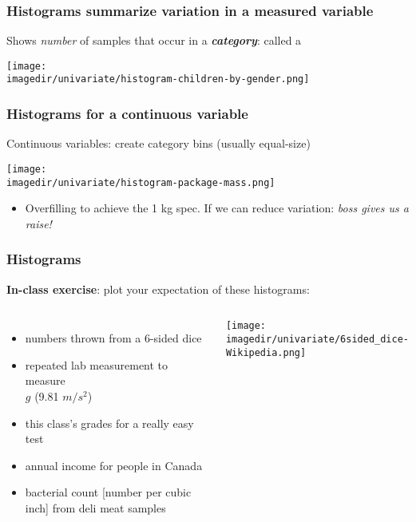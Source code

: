 \begin{frame}\frametitle{Histograms summarize variation in a measured variable}

	Shows \emph{number} of samples that occur in a \emph{\textbf{category}}: called a {}
	\begin{center}
		\texttt{[image: \\imagedir/univariate/histogram-children-by-gender.png]}
	\end{center}
\end{frame}

\begin{frame}\frametitle{Histograms for a \textbf{continuous} variable}
	Continuous variables: create category bins (usually equal-size)
	\begin{center}
		\texttt{[image: \\imagedir/univariate/histogram-package-mass.png]}
	\end{center}
	\begin{itemize}
		\item	Overfilling to achieve the 1 kg spec. If we can reduce variation: \emph{boss gives us a raise!}
	\end{itemize}
\end{frame}

\begin{frame}\frametitle{Histograms}
	\textbf{In-class exercise}: plot your expectation of these histograms: \vspace{2cm}
	
	\begin{columns}
			\begin{itemize}
				\item	numbers thrown from a 6-sided dice
				\item	repeated lab measurement to measure \\$g$ (9.81 $m/s^2$)
				\item	this class's grades for a really easy test
				\item	annual income for people in Canada
				\item	bacterial count [number per cubic inch] from deli meat samples
			\end{itemize}
			\texttt{[image: \\imagedir/univariate/6sided\_dice-Wikipedia.png]}
	\end{columns}
\end{frame}

